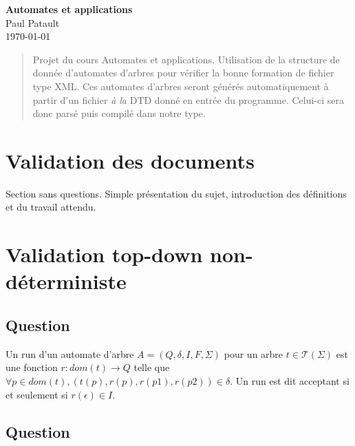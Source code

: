 \documentclass[twoside,11pt]{article}
\begin{document}

\thispagestyle{empty}

\vspace*{1.3cm}
\begin{center}
    \textbf{\LARGE Automates et applications} \\
    \bigskip\bigskip
    {\large Paul Patault} \\ %
    \bigskip
    \today
    \bigskip
\end{center}

\begin{abstract}
    Projet du cours Automates et applications. Utilisation de la structure de
    donnée d'automates d'arbres pour vérifier la bonne formation de fichier type
    XML. Ces automates d'arbres seront générés automatiquement à partir d'un fichier
    \textit{à la} DTD donné en entrée du programme. Celui-ci sera donc parsé puis
    compilé dans notre type.
\end{abstract}


\section{Validation des documents}
Section sans questions.
Simple présentation du sujet, introduction des définitions et du travail attendu.


\section{Validation top-down non-déterministe}
\subsection{Question}

Un run d'un automate d'arbre $A = (Q, \delta, I, F, \Sigma)$
pour un arbre $t \in {\mathcal{T}}(\Sigma)$
est une fonction $r : dom(t) \to Q$
telle que $\forall p \in dom(t), (t(p), r(p), r(p1),r(p2)) \in \delta$.
Un run est dit acceptant si et seulement si $r (\epsilon) \in I$.

\subsection{Question}
\end{document}
